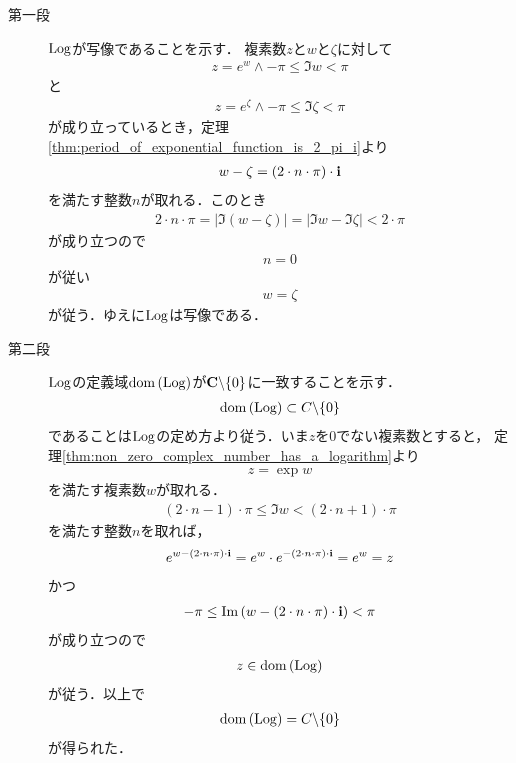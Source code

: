 	\begin{sketch}\mbox{}
		\begin{description}
			\item[第一段] $\operatorname{Log}$が写像であることを示す．
				複素数$z$と$w$と$\zeta$に対して
				\begin{align}
					z = e^{w} \wedge -\pi \leq \Im{w} < \pi
				\end{align}
				と
				\begin{align}
					z = e^{\zeta} \wedge -\pi \leq \Im{\zeta} < \pi
				\end{align}
				が成り立っているとき，定理\ref{thm:period_of_exponential_function_is_2_pi_i}より
				\begin{align}
					w - \zeta = (2 \cdot n \cdot \pi) \cdot \mathbf{i}
				\end{align}
				を満たす整数$n$が取れる．このとき
				\begin{align}
					2 \cdot n \cdot \pi = |\Im{(w - \zeta)}| = |\Im{w} - \Im{\zeta}| < 2 \cdot \pi
				\end{align}
				が成り立つので
				\begin{align}
					n = 0
				\end{align}
				が従い
				\begin{align}
					w = \zeta
				\end{align}
				が従う．ゆえに$\operatorname{Log}$は写像である．
				
			\item[第二段] $\operatorname{Log}$の定義域$\operatorname*{dom} \left(\operatorname{Log}\right)$が$\mathbf{C} \backslash \{0\}$に一致することを示す．
				\begin{align}
					\operatorname*{dom} \left(\operatorname{Log}\right) \subset C \backslash \{0\}
				\end{align}
				であることは$\operatorname{Log}$の定め方より従う．いま$z$を$0$でない複素数とすると，
				定理\ref{thm:non_zero_complex_number_has_a_logarithm}より
				\begin{align}
					z = \exp{w}
				\end{align}
				を満たす複素数$w$が取れる．
				\begin{align}
					(2 \cdot n - 1) \cdot \pi \leq \Im{w} < (2 \cdot n+1) \cdot \pi
				\end{align}
				を満たす整数$n$を取れば，
				\begin{align}
					e^{w - (2 \cdot n \cdot \pi) \cdot \mathbf{i}} = e^{w} \cdot e^{- (2 \cdot n \cdot \pi) \cdot \mathbf{i}}
					= e^{w} = z
				\end{align}
				かつ
				\begin{align}
					-\pi \leq \operatorname{Im} \left(w - (2 \cdot n \cdot \pi) \cdot \mathbf{i}\right) < \pi
				\end{align}
				が成り立つので
				\begin{align}
					z \in \operatorname*{dom} \left(\operatorname{Log}\right)
				\end{align}
				が従う．以上で
				\begin{align}
					\operatorname*{dom} \left(\operatorname{Log}\right) = C \backslash \{0\}
				\end{align}
				が得られた．
				\QED
		\end{description}
	\end{sketch}
	
